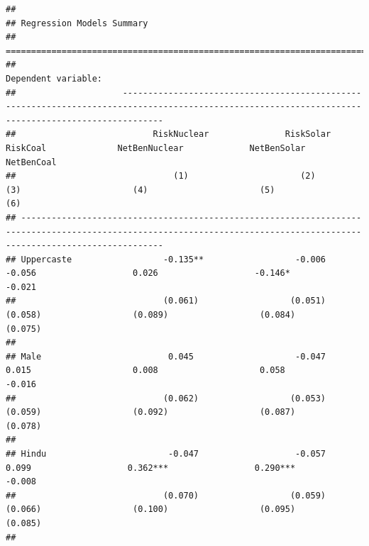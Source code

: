 \documentclass[
]{article}
\begin{document}
\begin{verbatim}
## 
## Regression Models Summary
## ========================================================================================================================================================================
##                                                                                     Dependent variable:                                                                 
##                     ----------------------------------------------------------------------------------------------------------------------------------------------------
##                           RiskNuclear               RiskSolar                 RiskCoal              NetBenNuclear             NetBenSolar              NetBenCoal       
##                               (1)                      (2)                      (3)                      (4)                      (5)                      (6)          
## ------------------------------------------------------------------------------------------------------------------------------------------------------------------------
## Uppercaste                  -0.135**                  -0.006                   -0.056                   0.026                   -0.146*                  -0.021         
##                             (0.061)                  (0.051)                  (0.058)                  (0.089)                  (0.084)                  (0.075)        
##                                                                                                                                                                         
## Male                         0.045                    -0.047                   0.015                    0.008                    0.058                   -0.016         
##                             (0.062)                  (0.053)                  (0.059)                  (0.092)                  (0.087)                  (0.078)        
##                                                                                                                                                                         
## Hindu                        -0.047                   -0.057                   0.099                   0.362***                 0.290***                 -0.008         
##                             (0.070)                  (0.059)                  (0.066)                  (0.100)                  (0.095)                  (0.085)        
##                                                                                                                                                                         

\end{verbatim}
\end{document}
